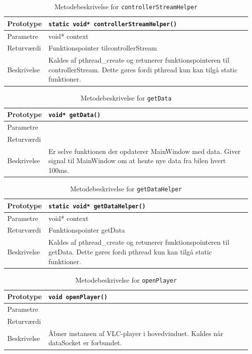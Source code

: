 \begin{table}[H]
\begin{tabularx}{\textwidth}{| L{2.5 cm} | Z |} \hline
Prototype & \texttt{static void* controllerStreamHelper()} \\\hline
Parametre & void* context  \\\hline
Returværdi & Funktionspointer tilcontrollerStream  \\\hline
Beskrivelse & Kaldes af pthread\_create og retunerer funktionspointeren til controllerStream. Dette gøres fordi pthread kun kan tilgå static funktioner.  \\\hline
\end{tabularx}
\caption{Metodebeskrivelse for \texttt{controllerStreamHelper}}
\label{table:met_controllerStreamHelper}
\end{table}

\begin{table}[H]
\begin{tabularx}{\textwidth}{| L{2.5 cm} | Z |} \hline
Prototype & \texttt{void* getData()} \\\hline
Parametre &   \\\hline
Returværdi &  \\\hline
Beskrivelse & Er selve funktionen der opdaterer MainWindow med data. Giver signal til MainWindow om at hente nye data fra bilen hvert 100ms.  \\\hline
\end{tabularx}
\caption{Metodebeskrivelse for \texttt{getData}}
\label{table:met_getData}
\end{table}

\begin{table}[H]
\begin{tabularx}{\textwidth}{| L{2.5 cm} | Z |} \hline
Prototype & \texttt{static void* getDataHelper()} \\\hline
Parametre & void* context  \\\hline
Returværdi & Funktionspointer getData  \\\hline
Beskrivelse & Kaldes af pthread\_create og retunerer funktionspointeren til getData. Dette gøres fordi pthread kun kan tilgå static funktioner.  \\\hline
\end{tabularx}
\caption{Metodebeskrivelse for \texttt{getDataHelper}}
\label{table:met_getDataHelper}
\end{table}

\begin{table}[H]
\begin{tabularx}{\textwidth}{| L{2.5 cm} | Z |} \hline
Prototype & \texttt{void openPlayer()} \\\hline
Parametre &  \\\hline
Returværdi &  \\\hline
Beskrivelse & Åbner instansen af VLC-player i hovedvinduet. Kaldes når dataSocket er forbundet.  \\\hline
\end{tabularx}
\caption{Metodebeskrivelse for \texttt{openPlayer}}
\label{table:met_openPlayer}
\end{table}

